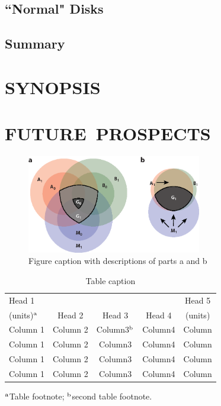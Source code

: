 \documentclass[a4paper]{ar-1col}
\begin{document}
\subsection{``Normal" Disks}

\subsection{Summary}


\section{SYNOPSIS} \label{sec:summary}



\section{FUTURE\ PROSPECTS} \label{sec:future}




\begin{figure}[h]
\includegraphics[width=3in]{SampleFigure}
\caption{Figure caption with descriptions of parts a and b}
\label{fig1}
\end{figure}


\begin{table}[h]
\caption{Table caption}
\label{tab1}
\begin{center}
\begin{tabular}{@{}l|c|c|c|c@{}}
\hline
Head 1 &&&&Head 5\\
{(}units)$^{\rm a}$ &Head 2 &Head 3 &Head 4 &{(}units)\\
\hline
Column 1 &Column 2 &Column3$^{\rm b}$ &Column4 &Column\\
Column 1 &Column 2 &Column3 &Column4 &Column\\
Column 1 &Column 2 &Column3 &Column4 &Column\\
Column 1 &Column 2 &Column3 &Column4 &Column\\
\hline
\end{tabular}
\end{center}
\begin{tabnote}
$^{\rm a}$Table footnote; $^{\rm b}$second table footnote.
\end{tabnote}
\end{table}
\end{document}
